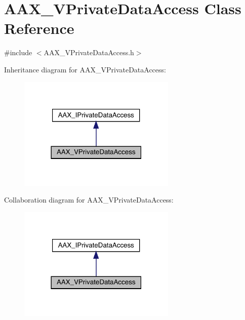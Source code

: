 \hypertarget{a01933}{}\section{A\+A\+X\+\_\+\+V\+Private\+Data\+Access Class Reference}
\label{a01933}


{\ttfamily \#include $<$A\+A\+X\+\_\+\+V\+Private\+Data\+Access.\+h$>$}



Inheritance diagram for A\+A\+X\+\_\+\+V\+Private\+Data\+Access\+:
\nopagebreak
\begin{figure}[H]
\begin{center}
\leavevmode
\includegraphics[width=213pt]{a01932}
\end{center}
\end{figure}


Collaboration diagram for A\+A\+X\+\_\+\+V\+Private\+Data\+Access\+:
\nopagebreak
\begin{figure}[H]
\begin{center}
\leavevmode
\includegraphics[width=213pt]{a01931}
\end{center}
\end{figure}


